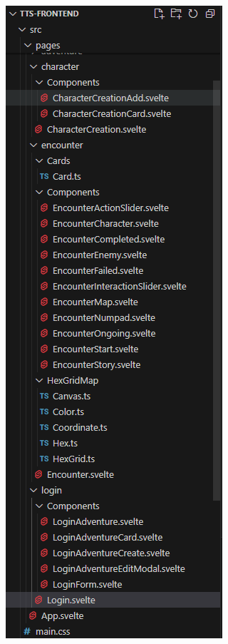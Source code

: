 \begin{figure}[H]
  \begin{minipage}{0.25\textwidth}
    \centering
    \includegraphics[width=\textwidth]{resources/figures/example7.png}

\end{minipage}
\end{figure}
